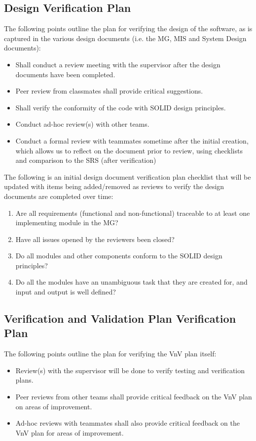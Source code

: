 \documentclass[12pt, titlepage]{article}
\begin{document}
\subsection{Design Verification Plan}
The following points outline the plan for verifying the design of the software, as is captured in the various design documents (i.e. the MG, MIS and System Design documents):
\begin{itemize}
    \item Shall conduct a review meeting with the supervisor after the design documents have been completed. 
    \item Peer review from classmates shall provide critical suggestions.
    \item Shall verify the conformity of the code with SOLID design principles.
    \item Conduct ad-hoc review(s) with other teams.
    \item Conduct a formal review with teammates sometime after the initial creation, which allows us to reflect on the document prior to review, using checklists and comparison to the SRS (after verification)
\end{itemize}

\noindent The following is an initial design document verification plan checklist that will be updated with items being added/removed as reviews to verify the design documents are completed over time:
\begin{enumerate}[label=$\square$]
    \item Are all requirements (functional and non-functional) traceable to at least one implementing module in the MG?
    \item Have all issues opened by the reviewers been closed?
    \item Do all modules and other components conform to the SOLID design principles?
    \item Do all the modules have an unambiguous task that they are created for, and input and output is well defined?
\end{enumerate}

\subsection{Verification and Validation Plan Verification Plan}
The following points outline the plan for verifying the VnV plan itself:
\begin{itemize}
    \item Review(s) with the supervisor will be done to verify testing and verification plans. 
    \item Peer reviews from other teams shall provide critical feedback on the VnV plan on areas of improvement.
    \item Ad-hoc reviews with teammates shall also provide critical feedback on the VnV plan for areas of improvement.
\end{itemize}
\end{document}
